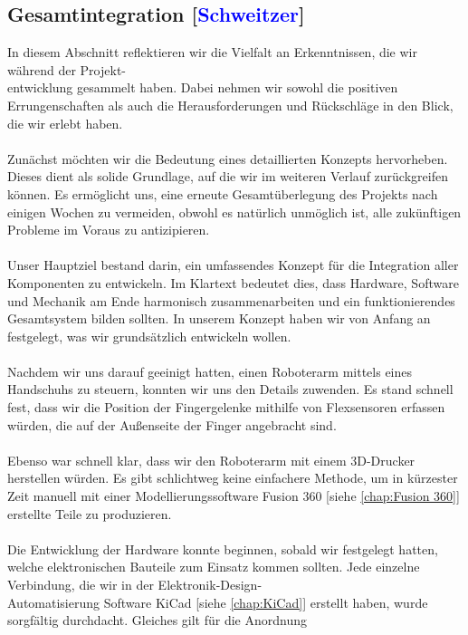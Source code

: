 \documentclass[titlepage,12pt,twoside]{article}
\begin{document}
\subsection{Gesamtintegration [\textcolor{blue}{Schweitzer}]}
In diesem Abschnitt reflektieren wir die Vielfalt an Erkenntnissen, die wir 
während der Projekt-\\entwicklung gesammelt haben. Dabei nehmen wir sowohl die 
positiven Errungenschaften als auch die Herausforderungen und Rückschläge in 
den Blick, die wir erlebt haben. \\
\\
Zunächst möchten wir die Bedeutung eines detaillierten Konzepts hervorheben. 
Dieses dient als solide Grundlage, auf die wir im weiteren Verlauf zurückgreifen 
können. Es ermöglicht uns, eine erneute Gesamtüberlegung des Projekts nach 
einigen Wochen zu vermeiden, obwohl es natürlich unmöglich ist, alle zukünftigen 
Probleme im Voraus zu antizipieren. \\
\\
Unser Hauptziel bestand darin, ein umfassendes Konzept für die Integration 
aller Komponenten zu entwickeln. Im Klartext bedeutet dies, dass Hardware, 
Software und Mechanik am Ende harmonisch zusammenarbeiten und ein funktionierendes 
Gesamtsystem bilden sollten. In unserem Konzept haben wir von Anfang an 
festgelegt, was wir grundsätzlich entwickeln wollen. \\
\\
Nachdem wir uns darauf geeinigt hatten, einen Roboterarm mittels eines 
Handschuhs zu steuern, konnten wir uns den Details zuwenden. Es stand schnell 
fest, dass wir die Position der Fingergelenke mithilfe von Flexsensoren 
erfassen würden, die auf der Außenseite der Finger angebracht sind. \\
\\
Ebenso war schnell klar, dass wir den Roboterarm mit einem 3D-Drucker 
herstellen würden. Es gibt schlichtweg keine einfachere Methode, um in 
kürzester Zeit manuell mit einer Modellierungssoftware Fusion 360 [siehe \textcolor{blue}{\autoref{chap:Fusion 360}}] erstellte 
Teile zu produzieren. \\
\\
Die Entwicklung der Hardware konnte beginnen, sobald wir festgelegt hatten, 
welche elektronischen Bauteile zum Einsatz kommen sollten. Jede einzelne 
Verbindung, die wir in der Elektronik-Design-\\Automatisierung Software KiCad [siehe \textcolor{blue}{\autoref{chap:KiCad}}]
erstellt haben, wurde sorgfältig durchdacht. Gleiches gilt für die Anordnung 
\end{document}
